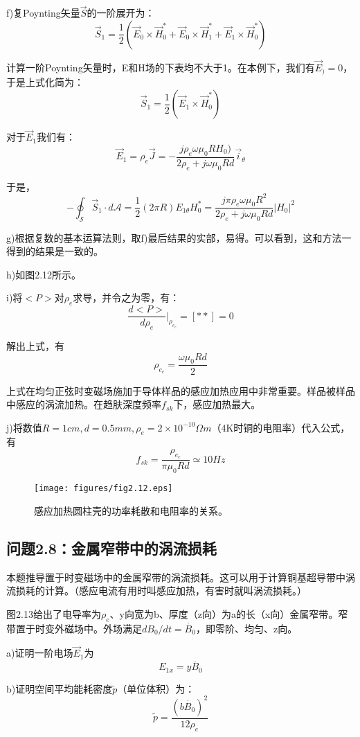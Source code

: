f)复Poynting矢量$\vec{S}$的一阶展开为：
$$\vec{S}_1=\frac{1}{2}(\vec{E}_0 \times \vec{H}_0^*+\vec{E}_0 \times \vec{H}_1^*+\vec{E}_1 \times \vec{H}_0^*)$$

计算一阶Poynting矢量时，E和H场的下表均不大于1。在本例下，我们有$\vec{E}_)=0$，于是上式化简为：
$$\vec{S}_1=\frac{1}{2}(\vec{E}_1 \times \vec{H}_0^*)$$

对于$\vec{E}_1$我们有：
$$\vec{E}_1=\rho_e \vec{J}=-\frac{j\rho_e \omega \mu_0 R H_0)}{2\rho_e+j\omega \mu_0 R d}\vec{i}_\theta$$

于是，
$$-\oint_{\mathcal{S}}\vec{S}_1 \cdot d\mathcal{A}=\frac{1}{2}(2\pi R)E_{1\theta} H_0^*=\frac{j\pi\rho_e \omega \mu_0 R^2}{2\rho_e+j\omega \mu_0 R d} |H_0|^2$$

g)根据复数的基本运算法则，取f)最后结果的实部，易得。可以看到，这和方法一得到的结果是一致的。

h)如图2.12所示。

i)将$<P>$对$\rho_e$求导，并令之为零，有：
$$\frac{d<P>}{d\rho_e} |_{\rho_{e_c}}=[**]=0$$

解出上式，有
$$\rho_{e_c}=\frac{\omega \mu_0 R d}{2}$$

上式在均匀正弦时变磁场施加于导体样品的感应加热应用中非常重要。样品被样品中感应的涡流加热。在趋肤深度频率$f_{sk}$下，感应加热最大。

j)将数值$R=1cm, d=0.5mm,\rho_e=2\times 10^{-10}\Omega m$（4K时铜的电阻率）代入公式，有
$$f_{sk}=\frac{\rho_{e_c}}{\pi\mu_0 R d}\simeq 10Hz$$

\begin{figure}
  \centering
 \texttt{[image: figures/fig2.12.eps]}
  \caption{感应加热圆柱壳的功率耗散和电阻率的关系。}
\end{figure}


\subsection{问题2.8：金属窄带中的涡流损耗}
本题推导置于时变磁场中的金属窄带的涡流损耗。这可以用于计算铜基超导带中涡流损耗的计算。（感应电流有用时叫感应加热，有害时就叫涡流损耗。）

图2.13给出了电导率为$\rho_e$、y向宽为b、厚度（z向）为a的长（x向）金属窄带。窄带置于时变外磁场中。外场满足$dB_0/dt=\dot{B_0}$，即零阶、均匀、z向。

a)证明一阶电场$\vec{E}_1$为
$$E_{1x}=y\dot{B_0}$$

b)证明空间平均能耗密度$\tilde{p}$（单位体积）为：
$$\tilde{p}=\frac{(b\dot{B_0})^2}{12\rho_e}$$

